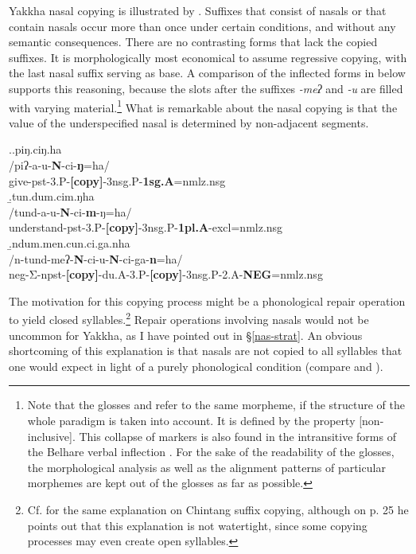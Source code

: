 Yakkha nasal copying is illustrated by \Next. Suffixes that consist of nasals or that contain nasals occur more than once under certain conditions, and without any semantic consequences. There are no contrasting forms that lack the copied suffixes. It is  morphologically most economical to assume regressive copying, with the last nasal suffix serving as base. A comparison of the inflected forms in \Next below supports this reasoning, because the slots after the suffixes \emph{-meʔ} and \emph{-u} are filled with varying material.\footnote{Note that the glosses  and  refer to the same morpheme, if the structure of the whole paradigm is taken into account. It is defined by the property [non-inclusive]. This collapse of markers is also found  in the intransitive forms of the Belhare verbal inflection \citep{Bickel1995In-the-vestibule}. For the sake of the readability of the glosses, the morphological analysis as well as the alignment patterns of particular morphemes are kept out of the glosses as far as possible.} What is remarkable about the nasal copying is that the value of the underspecified nasal is determined by non-adjacent segments.


\ex.\a.\glll piŋ.ciŋ.ha\\
		/piʔ-a-u-{\bf N}-ci-{\bf ŋ}=ha/\\
		give{\sc -pst-3.P-{\bf [copy]}-3nsg.P-{\bf 1sg.A}=nmlz.nsg}\\
 	\b.\glll tun.dum.cim.ŋha\\
	/tund-a-u-{\bf N}-ci-{\bf m}-ŋ=ha/\\
	understand{\sc -pst-3.P-{\bf [copy]}-3nsg.P-{\bf 1pl.A}-excl=nmlz.nsg}		\\
	\b.\glll ndum.men.cun.ci.ga.nha\\
	/n-tund-meʔ-{\bf N}-ci-u-{\bf N}-ci-ga-{\bf n}=ha/\\
	{\sc neg-}Σ{\sc -npst-{\bf [copy]}-du.A-3.P-{\bf [copy]}-3nsg.P-2.A-{\bf NEG}=nmlz.nsg}\\

	
The motivation for this copying process might be a phonological repair operation to yield closed syllables.\footnote{Cf. \citet[22]{Schikowski2012_Morphology} for the same explanation on Chintang suffix copying, although on p. 25 he points out that this explanation is not watertight, since some copying processes may even create open syllables.} Repair operations involving nasals would not be uncommon for Yakkha, as I have pointed out in §\ref{nas-strat}. An obvious shortcoming of this explanation is that nasals are not copied to all syllables that one would expect in light of a purely phonological condition (compare \Next[a] and \Next[b]). 


